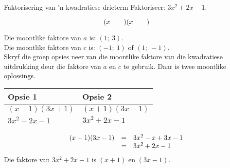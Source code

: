 \begin{wex}{Faktorisering van ’n kwadratiese drieterm}
{Faktoriseer: $3{x}^{2}+2x-1$.} 
{
\begin{equation*}
(x\phantom{\rule{2.em}{0ex}})(x\phantom{\rule{2.em}{0ex}})
\end{equation*}
\hspace*{-40pt}
\begin{minipage}{0.9\textwidth}

Die moontlike faktore van $a$ is: $(1;~3)$.\\
Die moontlike faktore van $c$ is: $(-1;~1)$ of $(1;~-1)$.\\
Skryf die groep opsies neer van die moontlike faktore van die kwadratiese uitdrukking deur die faktore van $a$ en $c$ te gebruik.
Daar is twee moontlike oplossings.
\end{minipage}
\par 

\begin{table}[H]

\begin{center}


\begin{tabular}{|l|l|}\hline
\textbf{Opsie 1} &
\textbf{Opsie 2}%
\\ \hline
$(x-1)(3x+1)$
&
$(x+1)(3x-1)$
\\ \hline
$3{x}^{2}-2x-1$
&
\uline{
$3{x}^{2}+2x-1$
}
\\ \hline
\end{tabular}
\end{center}

\end{table}

\begin{equation*}
\begin{array}{ccl}  
(x+1)(3x-1)& =& 3{x}^{2}-x+3x-1\hfill \\ & =& 3{x}^{2}+2x-1\end{array}
\end{equation*}
Die faktore van $3{x}^{2}+2x-1$ is $(x+1)$ en $(3x-1)$.
}
\end{wex}


